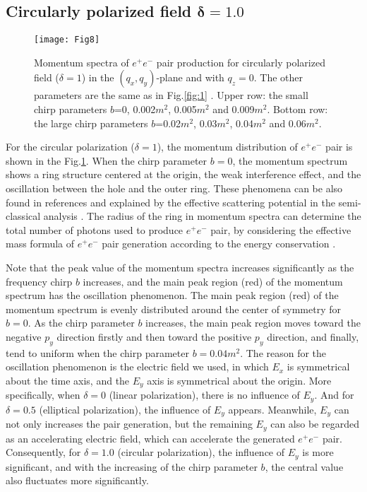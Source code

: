 \documentclass[aps,preprint,superscriptaddress]{revtex4}
\begin{document}
\begin{appendix}
\subsection{Circularly polarized field $\mathbf{\delta}$$\mathbf{=}$$\mathbf{1.0}$}


\begin{figure}[ht]%
\begin{center}
\texttt{[image: Fig8]}
\end{center}
\vspace{-10mm}
\caption{Momentum spectra of $e^{+}e^{-}$ pair production for circularly polarized field ($\delta=1$) in the $( q _x,q_y)$-plane and with $q_z=0$. The other parameters are the same as in Fig.\ref{fig:1} .
Upper row: the small chirp parameters $b$=0, 0.002$m^2$, 0.005$m^2$ and 0.009$m^2$. Bottom row: the large chirp parameters $b$=0.02$m^2$, 0.03$m^2$, 0.04$m^2$ and 0.06$m^2$.}
\label{fig:7}
\end{figure}

For the circular polarization ($\delta=1$), the momentum distribution of $e^{+}e^{-}$ pair is shown in the Fig.\ref{fig:7}. When the chirp parameter $b=0$, the momentum spectrum shows a ring structure centered at the origin, the weak interference effect, and the oscillation between the hole and the outer ring. These phenomena can be also found in references %
and explained by the effective scattering potential \cite{Dumlu:2010pd} in the semi-classical analysis \cite{Olugh:2019pd,Gong:2010pd}. The radius of the ring in momentum spectra can determine the total number of photons used to produce $e^{+}e^{-}$ pair, by considering the effective mass formula of $e^{+}e^{-}$ pair generation according to the energy conservation \cite{Vasak:1987ap}.

Note that the peak value of the momentum spectra increases significantly as the frequency chirp $b$ increases, and the main peak region (red) of the momentum spectrum has the oscillation phenomenon. The main peak region (red) of the momentum spectrum is evenly distributed around the center of symmetry for $b=0$. As the chirp parameter $b$ increases, the main peak region moves toward the negative $p_y$ direction firstly and then toward the positive $p_y$ direction, and finally, tend to uniform when the chirp parameter $b=0.04$$m^2$. The reason for the oscillation phenomenon is the electric field we used, in which $E_x$ is symmetrical about the time axis, and the $E_y$ axis is symmetrical about the origin. More specifically, when $\delta=0$ (linear polarization), there is no influence of $E_y$. And for $\delta=0.5$ (elliptical polarization), the influence of $E_y$ appears. Meanwhile, $E_y$ can not only increases the pair generation, but the remaining $E_y$ can also be regarded as an accelerating electric field, which can accelerate the generated $e^{+}e^{-}$ pair. Consequently, for $\delta=1.0$ (circular polarization), the influence of $E_y$ is more significant, and with the increasing of the chirp parameter $b$, the central value also fluctuates more significantly.


\end{appendix}
\end{document}
